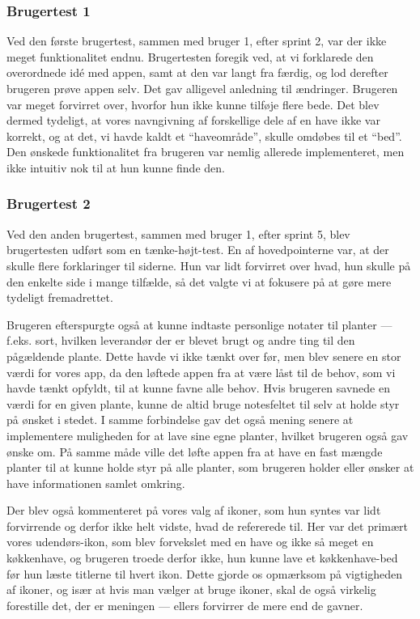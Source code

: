 \subsubsection{Brugertest 1}
Ved den første brugertest, sammen med bruger 1, efter sprint 2, var der ikke meget funktionalitet endnu. Brugertesten foregik ved, at vi forklarede den overordnede idé med appen, samt at den var langt fra færdig, og lod derefter brugeren prøve appen selv. Det gav alligevel anledning til ændringer. Brugeren var meget forvirret over, hvorfor hun ikke kunne tilføje flere bede. Det blev dermed tydeligt, at vores navngivning af forskellige dele af en have ikke var korrekt, og at det, vi havde kaldt et ``haveområde'', skulle omdøbes til et ``bed''. Den ønskede funktionalitet fra brugeren var nemlig allerede implementeret, men ikke intuitiv nok til at hun kunne finde den.

\subsubsection{Brugertest 2}
Ved den anden brugertest, sammen med bruger 1, efter sprint 5, blev brugertesten udført som en tænke-højt-test. En af hovedpointerne var, at der skulle flere forklaringer til siderne. Hun var lidt forvirret over hvad, hun skulle på den enkelte side i mange tilfælde, så det valgte vi at fokusere på at gøre mere tydeligt fremadrettet.

Brugeren efterspurgte også at kunne indtaste personlige notater til planter --- f.eks. sort, hvilken leverandør der er blevet brugt og andre ting til den pågældende plante. Dette havde vi ikke tænkt over før, men blev senere en stor værdi for vores app, da den løftede appen fra at være låst til de behov, som vi havde tænkt opfyldt, til at kunne favne alle behov. Hvis brugeren savnede en værdi for en given plante, kunne de altid bruge notesfeltet til selv at holde styr på ønsket i stedet. I samme forbindelse gav det også mening senere at implementere muligheden for at lave sine egne planter, hvilket brugeren også gav ønske om. På samme måde ville det løfte appen fra at have en fast mængde planter til at kunne holde styr på alle planter, som brugeren holder eller ønsker at have informationen samlet omkring.

Der blev også kommenteret på vores valg af ikoner, som hun syntes var lidt forvirrende og derfor ikke helt vidste, hvad de refererede til. Her var det primært vores udendørs-ikon, som blev forvekslet med en have og ikke så meget en køkkenhave, og brugeren troede derfor ikke, hun kunne lave et køkkenhave-bed før hun læste titlerne til hvert ikon. Dette gjorde os opmærksom på vigtigheden af ikoner, og især at hvis man vælger at bruge ikoner, skal de også virkelig forestille det, der er meningen --- ellers forvirrer de mere end de gavner.

